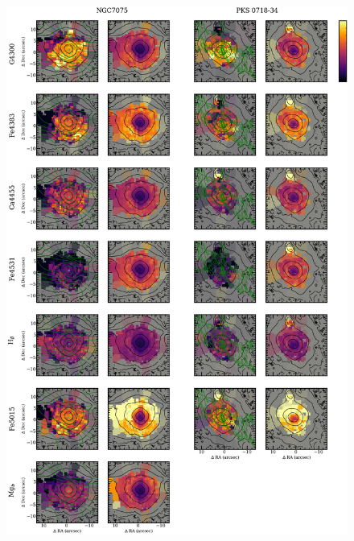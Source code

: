 		\begin{figure}
			\centering
			\includegraphics[height=0.94\textheight]{chapter4/vimos/abs5.png}
		\end{figure}

